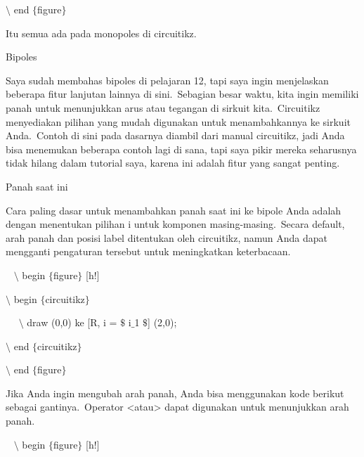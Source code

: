 \noindent 
 $\setminus$ end $ \{ $figure$ \} $ 
\par


\noindent 
Itu semua ada pada monopoles di circuitikz.
\par


\noindent 
Bipoles
\par


\noindent 
Saya sudah membahas bipoles di pelajaran 12, tapi saya ingin menjelaskan beberapa fitur lanjutan lainnya di sini. Sebagian besar waktu, kita ingin memiliki panah untuk menunjukkan arus atau tegangan di sirkuit kita. Circuitikz menyediakan pilihan yang mudah digunakan untuk menambahkannya ke sirkuit Anda. Contoh di sini pada dasarnya diambil dari manual circuitikz, jadi Anda bisa menemukan beberapa contoh lagi di sana, tapi saya pikir mereka seharusnya tidak hilang dalam tutorial saya, karena ini adalah fitur yang sangat penting.
\par


\noindent 
Panah saat ini
\par


\noindent 
Cara paling dasar untuk menambahkan panah saat ini ke bipole Anda adalah dengan menentukan pilihan i untuk komponen masing-masing. Secara default, arah panah dan posisi label ditentukan oleh circuitikz, namun Anda dapat mengganti pengaturan tersebut untuk meningkatkan keterbacaan.
\par


\noindent 
~ $\setminus$ begin $ \{ $figure$ \} $ [h!]
\par


\noindent 
 $\setminus$ begin $ \{ $circuitikz$ \} $
\par


\noindent 
~~ $\setminus$ draw (0,0) ke [R, i = $\$$ i$ \_ $1 $\$$] (2,0);
\par


\noindent 
 $\setminus$ end $ \{ $circuitikz$ \} $
\par


\noindent 
 $\setminus$ end $ \{ $figure$ \} $ 
\par


\noindent 
Jika Anda ingin mengubah arah panah, Anda bisa menggunakan kode berikut sebagai gantinya. Operator <atau> dapat digunakan untuk menunjukkan arah panah.
\par


\noindent 
~ $\setminus$ begin $ \{ $figure$ \} $ [h!]
\par


